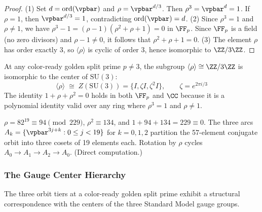 \begin{proof}
(1) Set $d = \mathrm{ord}(\vpbar)$ and $\rho = \vpbar^{d/3}$. Then $\rho^3 = \vpbar^d = 1$. If $\rho = 1$, then $\vpbar^{d/3} = 1$, contradicting $\mathrm{ord}(\vpbar) = d$. (2) Since $\rho^3 = 1$ and $\rho \neq 1$, we have $\rho^3 - 1 = (\rho - 1)(\rho^2 + \rho + 1) = 0$ in $\FF_p$. Since $\FF_p$ is a field (no zero divisors) and $\rho - 1 \neq 0$, it follows that $\rho^2 + \rho + 1 = 0$. (3) The element $\rho$ has order exactly 3, so $\langle\rho\rangle$ is cyclic of order 3, hence isomorphic to $\ZZ/3\ZZ$. \qedhere
\end{proof}

\begin{theorem}\label{thm:center}
At any color-ready golden split prime $p \neq 3$, the subgroup $\langle\rho\rangle \cong \ZZ/3\ZZ$ is isomorphic to the center of $\mathrm{SU}(3)$:
$$\langle\rho\rangle \;\cong\; Z(\mathrm{SU}(3)) = \{I, \zeta I, \zeta^2 I\}, \qquad \zeta = e^{2\pi i/3}$$
The identity $1 + \rho + \rho^2 = 0$ holds in both $\FF_p$ and $\CC$ because it is a polynomial identity valid over any ring where $\rho^3 = 1$ and $\rho \neq 1$.
\end{theorem}

\begin{remark}[Instantiation at $p = 229$]
$\rho = 82^{19} \equiv 94 \pmod{229}$, $\rho^2 \equiv 134$, and $1 + 94 + 134 = 229 \equiv 0$. The three arcs $A_k = \{\vpbar^{3j+k} : 0 \leq j < 19\}$ for $k = 0, 1, 2$ partition the 57-element conjugate orbit into three cosets of 19 elements each. Rotation by $\rho$ cycles $A_0 \to A_1 \to A_2 \to A_0$. (Direct computation.)
\end{remark}

\subsubsection*{The Gauge Center Hierarchy}

The three orbit tiers at a color-ready golden split prime exhibit a structural correspondence with the centers of the three Standard Model gauge groups.

